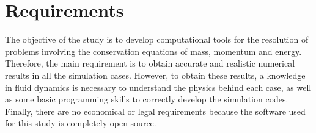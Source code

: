 
\section{Requirements}
The objective of the study is to develop computational tools for the resolution of problems involving the conservation equations of mass, momentum and energy. Therefore, the main requirement is to obtain accurate and realistic numerical results in all the simulation cases.
\newline
However, to obtain these results, a knowledge in fluid dynamics is necessary to understand the physics behind each case, as well as some basic programming skills to correctly develop the simulation codes.
\newline
Finally, there are no economical or legal requirements because the software used for this study is completely open source.